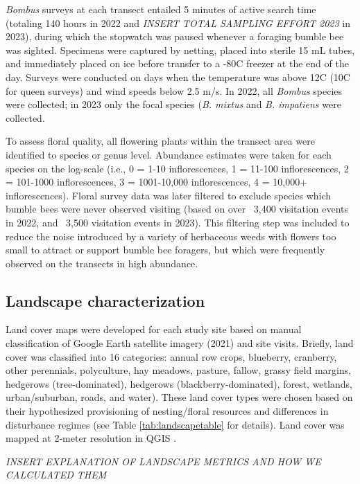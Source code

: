 \documentclass[12pt]{article}
\begin{document}
\textit{Bombus} surveys at each transect entailed 5 minutes of active search time (totaling 140 hours in 2022 and \emph{INSERT TOTAL SAMPLING EFFORT 2023} in 2023), during which the stopwatch was paused whenever a foraging bumble bee was sighted. Specimens were captured by netting, placed into sterile 15 mL tubes, and immediately placed on ice before transfer to a -80\degree C freezer at the end of the day.  Surveys were conducted on days when the temperature was above 12\degree C (10\degree C for queen surveys) and wind speeds below 2.5 m/s. In 2022, all \textit{Bombus} species were collected; in 2023 only the focal species (\textit{B. mixtus} and \textit{B. impatiens} were collected.

To assess floral quality, all flowering plants within the transect area were identified to species or genus level. Abundance estimates were taken for each species on the log-scale (i.e., 0 = 1-10 inflorescences, 1 = 11-100 inflorescences, 2 = 101-1000 inflorescences, 3 = 1001-10,000 inflorescences,  4 = 10,000+ inflorescences). Floral survey data was later filtered to exclude species which bumble bees were never observed visiting (based on over ~3,400 visitation events in 2022, and ~3,500 visitation events in 2023). This filtering step was included to reduce the noise introduced by a variety of herbaceous weeds with flowers too small to attract or support bumble bee foragers, but which were frequently observed on the transects in high abundance. 


\subsection{Landscape characterization}
Land cover maps were developed for each study site based on manual classification of Google Earth satellite imagery (2021) and site visits. Briefly, land cover was classified into 16 categories: annual row crops, blueberry, cranberry, other perennials, polyculture, hay meadows, pasture, fallow, grassy field margins, hedgerows (tree-dominated), hedgerows (blackberry-dominated), forest, wetlands, urban/suburban, roads, and water). These land cover types were chosen based on their hypothesized provisioning of nesting/floral resources and differences in disturbance regimes (see Table \ref{tab:landscapetable} for details). Land cover was mapped at 2-meter resolution in QGIS \parencite{QGIS_software}. 

\emph{INSERT EXPLANATION OF LANDSCAPE METRICS AND HOW WE CALCULATED THEM}
\end{document}
